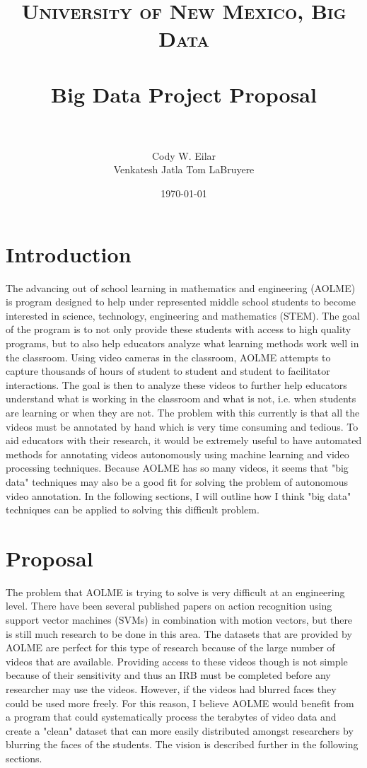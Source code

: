 \documentclass[paper=a4, fontsize=11pt]{scrartcl} %
\title{	
\normalfont \normalsize 
\textsc{University of New Mexico, Big Data} \\ [25pt] %
\horrule{0.5pt} \\[0.4cm] %
\huge Big Data Project Proposal \\ %
\horrule{2pt} \\[0.5cm] %
}
\author{Cody W. Eilar\\ 
Venkatesh Jatla 
Tom LaBruyere}
\date{\normalsize\today}
\numberwithin{equation}{section} %
\numberwithin{figure}{section} %
\numberwithin{table}{section} %
\begin{document}
\maketitle
\thispagestyle{empty}
\section{Introduction}
The advancing out of school learning in mathematics and engineering (AOLME) is program designed to help under 
represented middle school students to become interested in science, technology, engineering and mathematics (STEM). The goal of
the program is to not only provide these students with access to high quality programs, but to also help educators analyze
what learning methods work well in the classroom. Using video cameras in the classroom, AOLME attempts to capture 
thousands of hours of student to student and student to facilitator interactions. The goal is then to analyze these videos
to further help educators understand what is working in the classroom and what is not, i.e. when students are learning or when they are not. The problem with this currently is that
all the videos must be annotated by hand which is very time consuming and tedious. To aid educators with their research, 
it would be extremely useful to have automated methods for annotating videos autonomously using machine learning and 
video processing techniques. Because AOLME has so many videos, it seems that "big data" techniques may also be a
good fit for solving the problem of autonomous video annotation. In the following sections, I will outline how I think
"big data" techniques can be applied to solving this difficult problem. 

\section{Proposal}
The problem that AOLME is trying to solve is very difficult at an engineering level. There have been several published
papers on action recognition using support vector machines (SVMs) in combination with motion vectors, but there is still
much research to be done in this area. The datasets that are provided by AOLME are perfect for this type of research because
of the large number of videos that are available. Providing access to these videos though is not simple because of their 
sensitivity and thus an IRB must be completed before any researcher may use the videos. However, if the videos had blurred 
faces they could be used more freely. For this reason, I believe AOLME would benefit from a program that could systematically 
process the terabytes of video data and create a "clean" dataset that can more easily distributed amongst researchers by 
blurring the faces of the students. The vision is described further in the following sections. 
\end{document}
